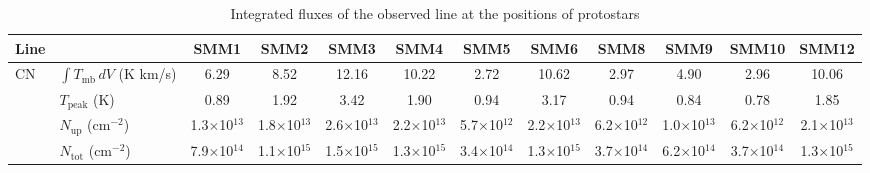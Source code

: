 \documentclass{aa}
\begin{document}
\begin{appendix}
\begin{sidewaystable*}
\caption{Integrated fluxes of the observed line at the positions of protostars}\label{table:fluxes}
\centering
\begin{tabular}{l l c c c c c c c c c c} 
\hline\hline             
Line &  & SMM1 & SMM2 & SMM3 & SMM4 & SMM5 & SMM6 & SMM8 & SMM9 & SMM10 & SMM12 \\
\hline \multirow{4}{*}{CN} & $\int{T_{\mathrm{mb}} \, dV}$ (K km/s) & 6.29 & 8.52 & 12.16 & 10.22 & 2.72 & 10.62 & 2.97 & 4.90 & 2.96 & 10.06 \\
& $T_\mathrm{peak}$ (K) & 0.89 & 1.92 & 3.42 & 1.90 & 0.94 & 3.17 & 0.94 & 0.84 & 0.78 & 1.85 \\
& $N_\mathrm{up}$ (cm$^{-2}$) & 1.3$\times$10$^{13}$ & 1.8$\times$10$^{13}$ & 2.6$\times$10$^{13}$ & 2.2$\times$10$^{13}$ & 5.7$\times$10$^{12}$ & 2.2$\times$10$^{13}$ & 6.2$\times$10$^{12}$ & 1.0$\times$10$^{13}$ & 6.2$\times$10$^{12}$ & 2.1$\times$10$^{13}$ \\
& $N_\mathrm{tot}$ (cm$^{-2}$) & 7.9$\times$10$^{14}$ & 1.1$\times$10$^{15}$ & 1.5$\times$10$^{15}$ & 1.3$\times$10$^{15}$ & 3.4$\times$10$^{14}$ & 1.3$\times$10$^{15}$ & 3.7$\times$10$^{14}$ & 6.2$\times$10$^{14}$ & 3.7$\times$10$^{14}$ & 1.3$\times$10$^{15}$\\
\hline\hline
\end{tabular}
\end{sidewaystable*}



\end{appendix}
\end{document}
